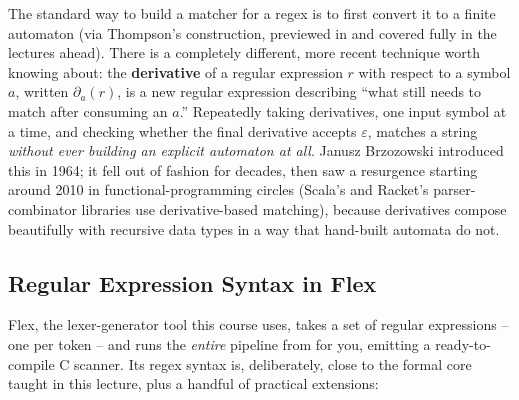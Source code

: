 \documentclass[full-course-notes.tex]{subfiles}
\begin{document}
The standard way to build a matcher for a regex is to first convert it to a finite automaton
(via Thompson's construction, previewed in  and covered fully in the
lectures ahead). There is a completely different, more recent technique worth knowing about:
the \textbf{derivative} of a regular expression $r$ with respect to a symbol $a$, written
$\partial_a(r)$, is a new regular expression describing ``what still needs to match after
consuming an $a$.'' Repeatedly taking derivatives, one input symbol at a time, and checking
whether the final derivative accepts $\varepsilon$, matches a string \emph{without ever
building an explicit automaton at all}. Janusz Brzozowski introduced this in 1964; it fell out
of fashion for decades, then saw a resurgence starting around 2010 in functional-programming
circles (Scala's and Racket's parser-combinator libraries use derivative-based matching),
because derivatives compose beautifully with recursive data types in a way that hand-built
automata do not.

\subsection{Regular Expression Syntax in Flex}
\label{sec:l3-flex-syntax}

Flex, the lexer-generator tool this course uses, takes a set of regular expressions -- one per
token -- and runs the \emph{entire} pipeline from  for you, emitting a
ready-to-compile C scanner. Its regex syntax is, deliberately, close to the formal core taught
in this lecture, plus a handful of practical extensions:
\end{document}
